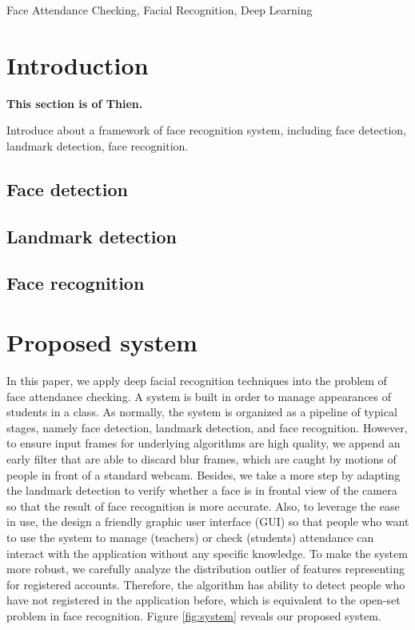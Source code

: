 \documentclass[journal, twocolumn]{IEEEtran}
\begin{document}
\begin{IEEEkeywords}
Face Attendance Checking, Facial Recognition, Deep Learning
\end{IEEEkeywords}


\IEEEpeerreviewmaketitle


\section{Introduction}
\label{introduction}
\textbf{This section is of Thien.}

Introduce about a framework of face recognition system, including face detection, landmark detection, face recognition.

\subsection{Face detection}

\subsection{Landmark detection}

\subsection{Face recognition}


\medskip
\section{Proposed system}
\label{proposed-system}

In this paper, we apply deep facial recognition techniques into the problem of face attendance checking. A system is built in order to manage appearances of students in a class. As normally, the system is organized as a pipeline of typical stages, namely face detection, landmark detection, and face recognition. However, to ensure input frames for underlying algorithms are high quality, we append an early filter that are able to discard blur frames, which are caught by motions of people in front of a standard webcam. Besides, we take a more step by adapting the landmark detection to verify whether a face is in frontal view of the camera so that the result of face recognition is more accurate. Also, to leverage the ease in use, the design a friendly graphic user interface (GUI) so that people who want to use the system to manage (teachers) or check (students) attendance can interact with the application without any specific knowledge. To make the system more robust, we carefully analyze the distribution outlier of features representing for registered accounts. Therefore, the algorithm has ability to detect people who have not registered in the application before, which is equivalent to the open-set problem in face recognition. Figure \ref{fig:system} reveals our proposed system.
\end{document}
